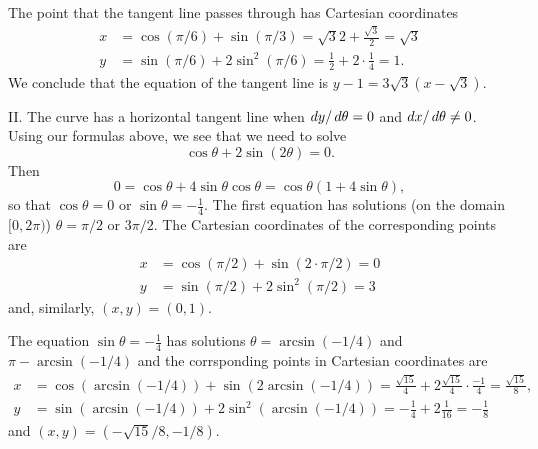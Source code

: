 \documentclass[]{ximera}
\begin{document}
\begin{problem}
\begin{solution}
The point that the tangent line passes through has Cartesian coordinates
\begin{align*}
x &= \cos(\pi/6) + \sin (\pi/3) = \sqrt{3}{2} + \frac{\sqrt{3}}{2} = \sqrt{3} \\
y &= \sin(\pi/6) + 2 \sin^2(\pi/6) = \frac{1}{2} + 2 \cdot \frac{1}{4} = 1.
\end{align*}
We conclude that the equation of the tangent line is $y-1 = 3 \sqrt{3}(x-\sqrt{3})$.

II. The curve has a horizontal tangent line when $\mathop{}\!d y/ \mathop{}\!d \theta = 0$ and $\mathop{}\!d x /\mathop{}\!d \theta \neq 0$. Using our formulas above, we see that we need to solve
$$
\cos \theta + 2 \sin(2 \theta) = 0.
$$
Then 
$$
0 = \cos \theta + 4 \sin \theta \cos \theta = \cos \theta ( 1+ 4 \sin \theta),
$$
so that $\cos \theta = 0$ or $\sin \theta = - \frac{1}{4}$. The first equation has solutions (on the domain $[0,2\pi)$) $\theta = \pi/2$ or $3\pi/2$. The Cartesian coordinates of the corresponding points are
\begin{align*}
x &= \cos (\pi/2) + \sin(2 \cdot \pi/2) = 0\\
y &= \sin(\pi/2) + 2 \sin^2(\pi/2) = 3
\end{align*}
and, similarly, $(x,y) = (0,1)$. 

The equation $\sin \theta = -\frac{1}{4}$ has solutions $\theta = \arcsin (-1/4)$ and $\pi - \arcsin(-1/4)$ and the corrsponding points in Cartesian coordinates are
\begin{align*}
x &= \cos (\arcsin(-1/4)) + \sin (2 \arcsin(-1/4)) = \frac{\sqrt{15}}{4} + 2 \frac{\sqrt{15}}{4} \cdot \frac{-1}{4} = \frac{\sqrt{15}}{8}, \\
y &= \sin(\arcsin(-1/4)) + 2 \sin^2 (\arcsin(-1/4)) = -\frac{1}{4} + 2 \frac{1}{16} = -\frac{1}{8}
\end{align*}
and $(x,y) = (-\sqrt{15}/8,-1/8)$. 
\end{solution}
\end{problem}
\end{document}
